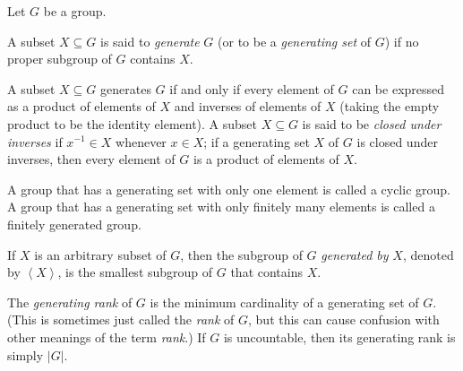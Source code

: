 \documentclass[12pt]{article}
\def\genby#1{{\left\langle #1\right\rangle}}
\begin{document}

Let $G$ be a group.

A subset $X\subseteq G$ is said to \emph{generate} $G$ 
(or to be a \emph{generating set} of $G$) 
if no proper subgroup of $G$ contains $X$.

A subset $X\subseteq G$ generates $G$ if and only if
every element of $G$ can be expressed as 
a product of elements of $X$ and inverses of elements of $X$ 
(taking the empty product to be the identity element).
A subset $X\subseteq G$ is said to be \emph{closed under inverses}
if $x^{-1}\in X$ whenever $x\in X$; 
if a generating set $X$ of $G$ is closed under inverses, 
then every element of $G$ is a product of elements of $X$.

A group that has a generating set with only one element 
is called a cyclic group.
A group that has a generating set with only finitely many elements 
is called a finitely generated group.

If $X$ is an arbitrary subset of $G$,
then the subgroup of $G$ \emph{generated by} $X$, denoted by $\genby{X}$,
is the smallest subgroup of $G$ that contains $X$.

The \emph{generating rank} of $G$ is 
the minimum cardinality of a generating set of $G$. 
(This is sometimes just called the \emph{rank} of $G$, but this can 
cause confusion with other meanings of the term {\it rank}.)
If $G$ is uncountable, then its generating rank is simply $|G|$.
\end{document}
